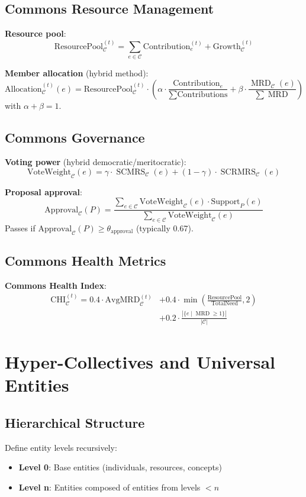 \documentclass[11pt,a4paper]{article}
\theoremstyle{definition}
\theoremstyle{remark}
\newcommand{\C}{\mathcal{C}}
\DeclareMathOperator{\SCMRS}{SCMRS}
\DeclareMathOperator{\SCRMRS}{SCRMRS}
\DeclareMathOperator{\MRD}{MRD}
\begin{document}
\subsection{Commons Resource Management}

\textbf{Resource pool}:
\[ \text{ResourcePool}_\C^{(t)} = \sum_{e \in \C} \text{Contribution}_e^{(t)} + \text{Growth}_\C^{(t)} \]

\textbf{Member allocation} (hybrid method):
\[ \text{Allocation}_\C^{(t)}(e) = \text{ResourcePool}_\C^{(t)} \cdot \left( \alpha \cdot \frac{\text{Contribution}_e}{\sum \text{Contributions}} + \beta \cdot \frac{\MRD_\C(e)}{\sum \MRD} \right) \]
with $\alpha + \beta = 1$.

\subsection{Commons Governance}

\textbf{Voting power} (hybrid democratic/meritocratic):
\[ \text{VoteWeight}_\C(e) = \gamma \cdot \SCMRS_\C(e) + (1-\gamma) \cdot \SCRMRS_\C(e) \]

\textbf{Proposal approval}:
\[ \text{Approval}_\C(P) = \frac{\sum_{e \in \C} \text{VoteWeight}_\C(e) \cdot \text{Support}_P(e)}{\sum_{e \in \C} \text{VoteWeight}_\C(e)} \]
Passes if $\text{Approval}_\C(P) \ge \theta_{\text{approval}}$ (typically 0.67).

\subsection{Commons Health Metrics}

\textbf{Commons Health Index}:
\begin{align*}
\text{CHI}_\C^{(t)} = 0.4 \cdot \text{AvgMRD}_\C^{(t)} &+ 0.4 \cdot \min\left(\frac{\text{ResourcePool}}{\text{TotalNeed}}, 2\right) \\
&+ 0.2 \cdot \frac{|\{e \mid \MRD \ge 1\}|}{|\C|}
\end{align*}

\section{Hyper-Collectives and Universal Entities}

\subsection{Hierarchical Structure}

Define entity levels recursively:
\begin{itemize}
\item \textbf{Level 0}: Base entities (individuals, resources, concepts)
\item \textbf{Level n}: Entities composed of entities from levels $< n$
\end{itemize}
\end{document}
